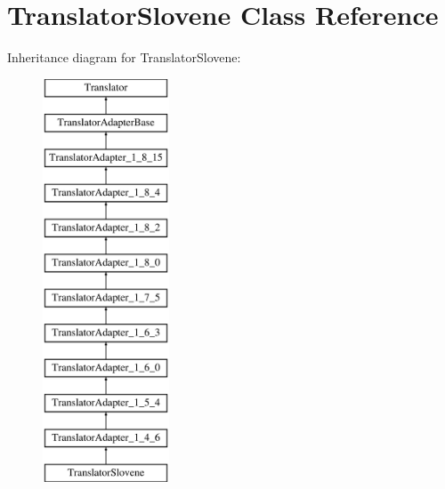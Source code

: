 \hypertarget{class_translator_slovene}{}\section{Translator\+Slovene Class Reference}
\label{class_translator_slovene}
Inheritance diagram for Translator\+Slovene\+:\begin{figure}[H]
\begin{center}
\leavevmode
\includegraphics[height=12.000000cm]{class_translator_slovene}
\end{center}
\end{figure}
